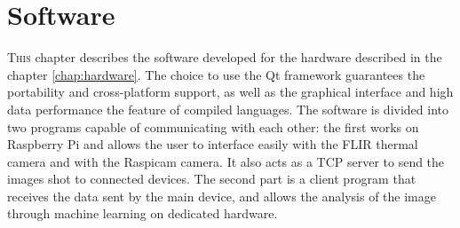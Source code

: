 \chapter{Software}
\label{chap:software}
%
\lettrine[lines=3]{T}{his} chapter describes the software developed for the
hardware described in the chapter \ref{chap:hardware}. The choice to use the Qt
framework guarantees the portability and cross-platform support, as well
as the graphical interface and high data performance the feature of compiled
languages.  The software is divided into two programs capable of communicating
with each other: the first works on Raspberry Pi and allows the user to
interface easily with the FLIR thermal camera and with the Raspicam camera. 
It also acts as a TCP server to send the images shot to connected devices. 
The second part is a client program that receives the data sent by the main
device, and allows the analysis of the image through machine learning on
dedicated hardware.
%



